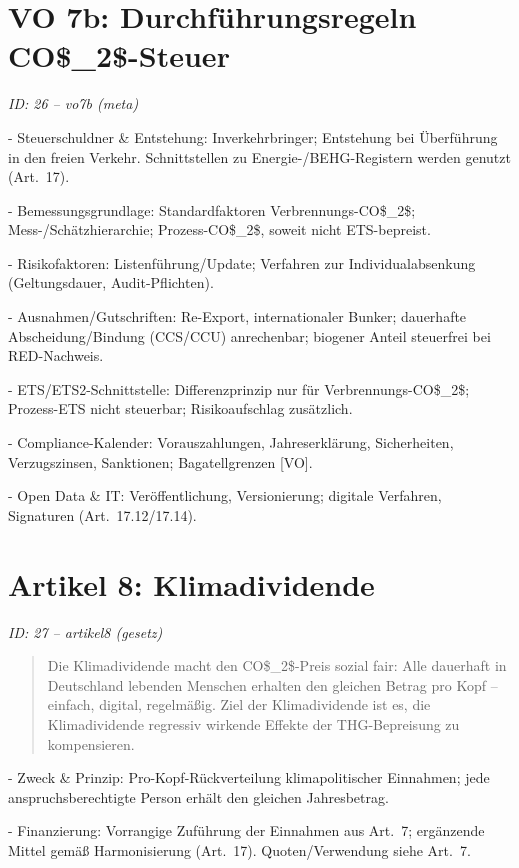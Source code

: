 \documentclass[12pt,a4paper]{scrartcl}
\begin{document}
\section[VO 7b: Durchführungsregeln CO\$\_2\$-Steuer]{VO 7b: Durchführungsregeln CO\$\_2\$-Steuer}
\noindent\textit{ID: 26 -- vo7b (meta)}

- Steuerschuldner \& Entstehung: Inverkehrbringer; Entstehung bei Überführung in den freien Verkehr. Schnittstellen zu Energie-/BEHG-Registern werden genutzt (Art. 17).

- Bemessungsgrundlage: Standardfaktoren Verbrennungs-CO\$\_2\$; Mess-/Schätzhierarchie; Prozess-CO\$\_2\$, soweit nicht ETS-bepreist.

- Risikofaktoren: Listenführung/Update; Verfahren zur Individualabsenkung (Geltungsdauer, Audit-Pflichten).

- Ausnahmen/Gutschriften: Re-Export, internationaler Bunker; dauerhafte Abscheidung/Bindung (CCS/CCU) anrechenbar; biogener Anteil steuerfrei bei RED-Nachweis.

- ETS/ETS2-Schnittstelle: Differenzprinzip nur für Verbrennungs-CO\$\_2\$; Prozess-ETS nicht steuerbar; Risikoaufschlag zusätzlich.

- Compliance-Kalender: Vorauszahlungen, Jahreserklärung, Sicherheiten, Verzugszinsen, Sanktionen; Bagatellgrenzen [VO].

- Open Data \& IT: Veröffentlichung, Versionierung; digitale Verfahren, Signaturen (Art. 17.12/17.14).


\section[Artikel 8: Klimadividende]{Artikel 8: Klimadividende}
\noindent\textit{ID: 27 -- artikel8 (gesetz)}

\begin{quote}
Die Klimadividende macht den CO\$\_2\$-Preis sozial fair: Alle dauerhaft in Deutschland lebenden Menschen erhalten den gleichen Betrag pro Kopf -- einfach, digital, regelmäßig. Ziel der Klimadividende ist es, die Klimadividende regressiv wirkende Effekte der THG-Bepreisung zu kompensieren.
\end{quote}

- Zweck \& Prinzip: Pro-Kopf-Rückverteilung klimapolitischer Einnahmen; jede anspruchsberechtigte Person erhält den gleichen Jahresbetrag.

- Finanzierung: Vorrangige Zuführung der Einnahmen aus Art. 7; ergänzende Mittel gemäß Harmonisierung (Art. 17). Quoten/Verwendung siehe Art. 7.
\end{document}
